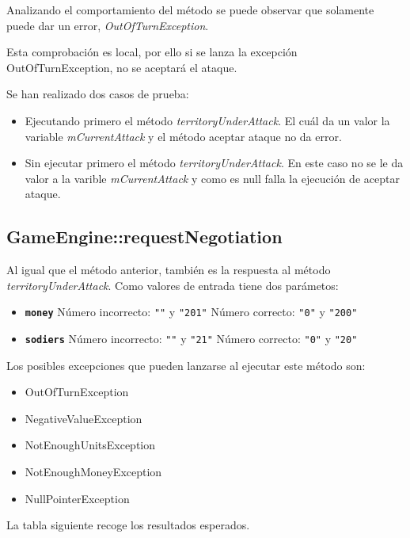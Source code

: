 Analizando el comportamiento del método se puede observar que solamente puede dar un error, \textit{OutOfTurnException}.

Esta comprobación es local, por ello si se lanza la excepción OutOfTurnException, no se aceptará el ataque.

Se han realizado dos casos de prueba:
\begin{itemize}
\item Ejecutando primero el método \textit{territoryUnderAttack}. El cuál da un valor la variable \textit{mCurrentAttack} y el método aceptar ataque no da error.
\item Sin ejecutar primero el método \textit{territoryUnderAttack}. En este caso no se le da valor a la varible \textit{mCurrentAttack} y como es null falla la ejecución de aceptar ataque.
\end{itemize}

\subsection{GameEngine::requestNegotiation}

Al igual que el método anterior, también es la respuesta al método \textit{territoryUnderAttack}. Como valores de entrada tiene dos parámetos:
\begin{itemize}
\item \textbf{\texttt{money}}
\subitem Número incorrecto: \texttt{""} y \texttt{"201"}
\subitem Número correcto: \texttt{"0"} y \texttt{"200"}

\item \textbf{\texttt{sodiers}}
\subitem Número incorrecto: \texttt{""} y \texttt{"21"}
\subitem Número correcto: \texttt{"0"} y \texttt{"20"}
\end{itemize}

Los posibles excepciones que pueden lanzarse al ejecutar este método son:
\begin{itemize}
\item OutOfTurnException
\item NegativeValueException
\item NotEnoughUnitsException
\item NotEnoughMoneyException
\item NullPointerException
\end{itemize}

\newpage
La tabla siguiente recoge los resultados esperados.

